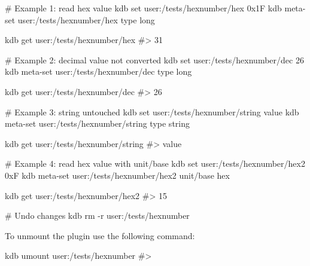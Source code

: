 \begin{DoxyCode}
# Example 1: read hex value
kdb set user:/tests/hexnumber/hex 0x1F
kdb meta-set user:/tests/hexnumber/hex type long

kdb get user:/tests/hexnumber/hex
#> 31

# Example 2: decimal value not converted
kdb set user:/tests/hexnumber/dec 26
kdb meta-set user:/tests/hexnumber/dec type long

kdb get user:/tests/hexnumber/dec
#> 26

# Example 3: string untouched
kdb set user:/tests/hexnumber/string value
kdb meta-set user:/tests/hexnumber/string type string

kdb get user:/tests/hexnumber/string
#> value

# Example 4: read hex value with unit/base
kdb set user:/tests/hexnumber/hex2 0xF
kdb meta-set user:/tests/hexnumber/hex2 unit/base hex

kdb get user:/tests/hexnumber/hex2
#> 15

# Undo changes
kdb rm -r user:/tests/hexnumber
\end{DoxyCode}



\begin{DoxyItemize}
\item To unmount the plugin use the following command\+: 
\begin{DoxyCode}
kdb umount user:/tests/hexnumber
#>
\end{DoxyCode}
 
\end{DoxyItemize}